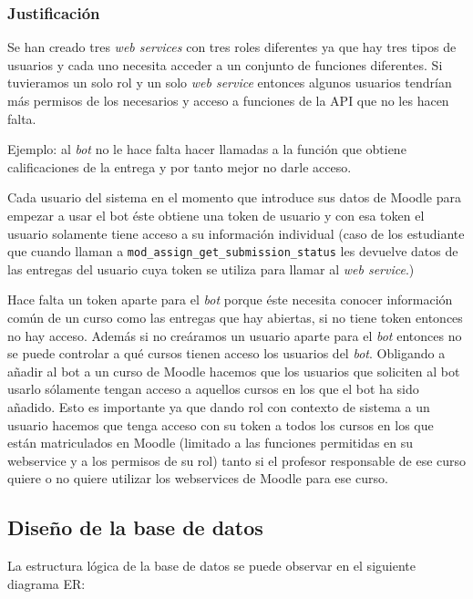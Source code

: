 \subsubsection{Justificación}

Se han creado tres \textit{web services} con tres roles diferentes ya que hay tres tipos de usuarios y cada uno necesita acceder a un conjunto de funciones diferentes. Si tuvieramos un solo rol y un solo \textit{web service} entonces algunos usuarios tendrían más permisos de los necesarios y acceso a funciones de la API que no les hacen falta.
\par
Ejemplo: al \textit{bot} no le hace falta hacer llamadas a la función que obtiene calificaciones de la entrega y por tanto mejor no darle acceso. 
\par
Cada usuario del sistema en el momento que introduce sus datos de Moodle para empezar a usar el bot éste obtiene una token de usuario y con esa token el usuario solamente tiene acceso a su información individual (caso de los estudiante que cuando llaman a \texttt{mod\_assign\_get\_submission\_status} les devuelve datos de las entregas del usuario cuya token se utiliza para llamar al \textit{web service}.)
\par
Hace falta un token aparte para el \textit{bot} porque éste necesita conocer información común de un curso como las entregas que hay abiertas, si no tiene token entonces no hay acceso. Además si no creáramos un usuario aparte para el \textit{bot} entonces no se puede controlar a qué cursos tienen acceso los usuarios del \textit{bot}. Obligando a añadir al bot a un curso de Moodle hacemos que los usuarios que soliciten al bot usarlo sólamente tengan acceso a aquellos cursos en los que el bot ha sido añadido. Esto es importante ya que dando rol con contexto de sistema a un usuario hacemos que tenga acceso con su token a todos los cursos en los que están matriculados en Moodle (limitado a las funciones permitidas en su webservice y a los permisos de su rol) tanto si el profesor responsable de ese curso quiere o no quiere utilizar los webservices de Moodle para ese curso.

\newpage
\subsection{Diseño de la base de datos}

La estructura lógica de la base de datos se puede observar en el siguiente diagrama ER:

